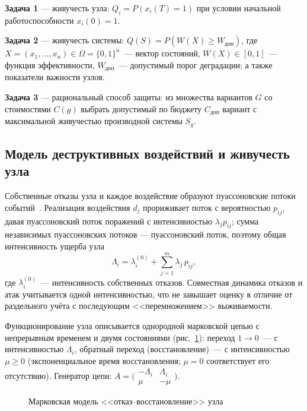 \documentclass[12pt]{article}
\begin{document}
\textbf{Задача 1} --- живучесть узла: $Q_i = P(x_i(T) = 1)$ при условии
начальной работоспособности $x_i(0) = 1$.

\textbf{Задача 2} --- живучесть системы: $Q(S) = P(W(X) \geq
W_{\text{доп}})$, где $X = (x_1, \dots, x_n) \in \Omega = \{0,1\}^n$~---
вектор состояний, $W(X) \in [0, 1]$~--- функция эффективности,
$W_{\text{доп}}$~--- допустимый порог деградации; а также показатели
важности узлов.

\textbf{Задача 3} --- рациональный способ защиты: из множества вариантов
$G$ со стоимостями $C(g)$ выбрать допустимый по бюджету $C_{\text{доп}}$
вариант с максимальной живучестью производной системы $S_g$.

\subsection{Модель деструктивных воздействий и живучесть узла}

Собственные отказы узла и каждое воздействие образуют пуассоновские потоки
событий~\cite{ventcel}. Реализация воздействия $d_j$ прориживает поток
с вероятностью $p_{ij}$, давая пуассоновский поток поражений с
интенсивностью $\lambda_j p_{ij}$; сумма независимых пуассоновских потоков
--- пуассоновский поток, поэтому общая интенсивность ущерба узла
\begin{equation}
\Lambda_i = \lambda_i^{(0)} + \sum_{j=1}^{m} \lambda_j\, p_{ij},
\label{eq:lambda}
\end{equation}
где $\lambda_i^{(0)}$~--- интенсивность собственных отказов. Совместная
динамика отказов и атак учитывается одной интенсивностью, что не завышает
оценку в отличие от раздельного учёта с последующим <<перемножением>>
выживаемости.

Функционирование узла описывается однородной марковской цепью с
непрерывным временем и двумя состояниями (рис.~\ref{fig:markov}):
переход $1 \to 0$~--- с интенсивностью $\Lambda_i$, обратный переход
(восстановление)~--- с интенсивностью $\mu \geq 0$ (экспоненциальное время
восстановления; $\mu = 0$ соответствует его отсутствию). Генератор цепи:
$A = \bigl(\begin{smallmatrix} -\Lambda_i & \Lambda_i \\ \mu & -\mu
\end{smallmatrix}\bigr)$.

\begin{figure}[htb]
\centering
{}
\caption{Марковская модель <<отказ--восстановление>> узла}
\label{fig:markov}
\end{figure}
\end{document}
